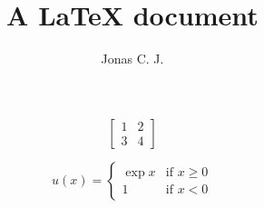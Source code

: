 \documentclass[a4paper, 12pt]{article}
\title{A \LaTeX{} document}
\author{Jonas C. J.}
\begin{document}
\begin{equation*}
\begin{bmatrix}
1 & 2 \\
3 & 4
\end{bmatrix}
\end{equation*}

\begin{equation*}
 u(x) =
  \begin{cases}
   \exp{x} & \text{if } x \geq 0 \\
   1       & \text{if } x < 0
  \end{cases}
\end{equation*}
\end{document}
